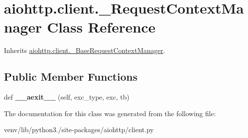 \hypertarget{classaiohttp_1_1client_1_1___request_context_manager}{}\section{aiohttp.\+client.\+\_\+\+Request\+Context\+Manager Class Reference}
\label{classaiohttp_1_1client_1_1___request_context_manager}


Inherits \hyperlink{classaiohttp_1_1client_1_1___base_request_context_manager}{aiohttp.\+client.\+\_\+\+Base\+Request\+Context\+Manager}.

\subsection*{Public Member Functions}
\begin{DoxyCompactItemize}
\item 
\mbox{\label{classaiohttp_1_1client_1_1___request_context_manager_a079b3a11ea28ebad86c6fe8abc4af0f4}} 
def {\bfseries \+\_\+\+\_\+aexit\+\_\+\+\_\+} (self, exc\+\_\+type, exc, tb)
\end{DoxyCompactItemize}


The documentation for this class was generated from the following file\+:\begin{DoxyCompactItemize}
\item 
venv/lib/python3./site-\/packages/aiohttp/client.\+py\end{DoxyCompactItemize}
